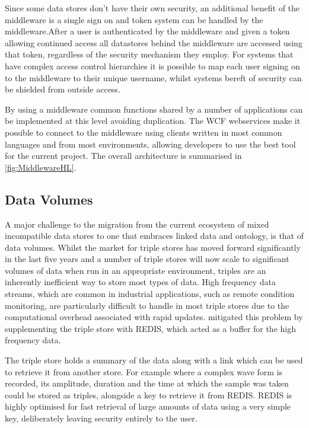 Since some data stores don't have their own security, an additional benefit of the middleware is a single sign on and token system can be handled by the middleware.After a user is authenticated by the middleware and given a token allowing continued access all datastores behind the middleware are accessed using that token, regardless of the security mechanism they employ. For systems that have complex access control hierarchies it is possible to map each user signing on to the middleware to their unique username, whilst systems bereft of security can be shielded from outside access. 

By using a middleware common functions shared by a number of applications can be implemented at this level avoiding duplication. The WCF webservices make it possible to connect to the middleware using clients written in most common languages and from most environments, allowing developers to use the best tool for the current project. The overall architecture is summarised in \autoref{fig:MiddlewareHL}.

\subsection{Data Volumes}

A major challenge to the migration from the current ecosystem of mixed incompatible data stores to one that embraces linked data and ontology, is that of data volumes. Whilst the market for triple stores has moved forward significantly in the last five years and a number of triple stores will now scale to significant volumes of data when run in an appropriate environment, triples are an inherently inefficient way to store most types of data. High frequency data streams, which are common in industrial applications, such as remote condition monitoring, are particularly difficult to handle in most triple stores due to the computational overhead associated with rapid updates. \citet{Tutcher2015} mitigated this problem by supplementing the triple store with REDIS, which acted as a buffer for the high frequency data.

The triple store holds a summary of the data along with a link which can be used to retrieve it from another store. For example where a complex wave form is recorded, its amplitude, duration and the time at which the sample was taken could be stored as triples, alongside a key to retrieve it from REDIS. REDIS is highly optimised for fast retrieval of large amounts of data using a very simple key, deliberately leaving security entirely to the user.

